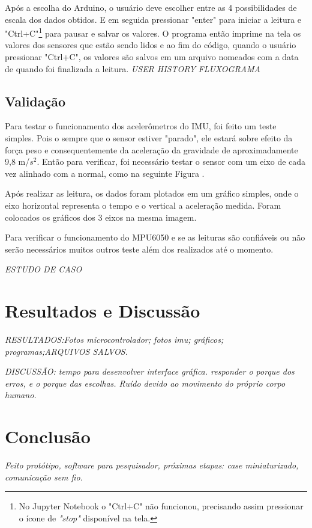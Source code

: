 		Após a escolha do Arduino, o usuário deve escolher entre as 4 possibilidades de escala dos dados obtidos. E em seguida pressionar "enter" para iniciar a leitura e "Ctrl+C"\footnote{No Jupyter Notebook o "Ctrl+C" não funcionou, precisando assim pressionar o ícone de \textit{"stop"} disponível na tela.} para pausar e salvar os valores. O programa então imprime na tela os valores dos sensores que estão sendo lidos e ao fim do código, quando o usuário pressionar "Ctrl+C", os valores são salvos em um arquivo nomeados com a data de quando foi finalizada a leitura.
		\textit{USER HISTORY}
		\textit{FLUXOGRAMA} 
		
\section {Validação}

	Para testar o funcionamento dos acelerômetros do IMU, foi feito um teste simples. Pois o sempre que o sensor estiver "parado", ele estará sobre efeito da força peso e consequentemente da aceleração da gravidade de aproximadamente 9,8 m/$ s^2 $. Então para verificar, foi necessário testar o sensor com um eixo de cada vez alinhado com a normal, como na seguinte Figura .
	
	Após realizar as leitura, os dados foram plotados em um gráfico simples, onde o eixo horizontal representa o tempo e o vertical a aceleração medida. Foram colocados os gráficos dos 3 eixos na mesma imagem. 
	
	Para verificar o funcionamento do MPU6050  e se as leituras são confiáveis ou não serão necessários muitos outros teste além dos realizados até o momento.
	
	\textit{ESTUDO DE CASO}
	
	
	
\chapter{Resultados e Discussão}
	
	\textit{RESULTADOS:Fotos microcontrolador; fotos imu; gráficos; programas;ARQUIVOS SALVOS.}
		
	\textit{DISCUSSÃO: tempo para desenvolver interface gráfica. responder o porque dos erros, e o porque das escolhas. Ruído devido ao movimento do próprio corpo humano. 	
	}
\chapter{Conclusão}

	\textit{Feito protótipo, software para pesquisador, próximas etapas: case miniaturizado, comunicação sem fio.}